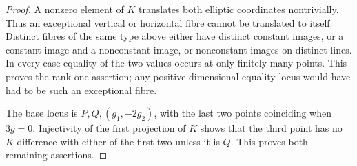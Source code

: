 \begin{proof}
A nonzero element of $K$ translates both elliptic coordinates
nontrivially. Thus an exceptional vertical or horizontal fibre cannot
be translated to itself. Distinct fibres of the same type above
either have distinct constant images, or a constant image and a
nonconstant image, or nonconstant images on distinct lines.
In every case equality of the two values occurs at only finitely
many points. This proves the rank-one assertion; any positive
dimensional equality locus would have had to be such an exceptional
fibre.

The base locus is $P,Q,(g_1,-2g_2)$, with the last two points
coinciding when $3g=0$. Injectivity of the first projection of $K$
shows that the third point has no $K$-difference with either of the
first two unless it is $Q$. This proves both remaining assertions.
\end{proof}

